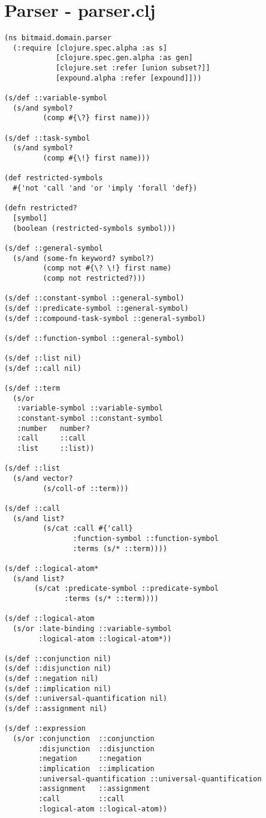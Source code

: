 \section{Parser - parser.clj}
\begin{lstlisting}
(ns bitmaid.domain.parser
  (:require [clojure.spec.alpha :as s]
            [clojure.spec.gen.alpha :as gen]
            [clojure.set :refer [union subset?]]
            [expound.alpha :refer [expound]]))

(s/def ::variable-symbol
  (s/and symbol?
         (comp #{\?} first name)))

(s/def ::task-symbol
  (s/and symbol?
         (comp #{\!} first name)))

(def restricted-symbols
  #{'not 'call 'and 'or 'imply 'forall 'def})

(defn restricted?
  [symbol]
  (boolean (restricted-symbols symbol)))

(s/def ::general-symbol
  (s/and (some-fn keyword? symbol?)
         (comp not #{\? \!} first name)
         (comp not restricted?)))

(s/def ::constant-symbol ::general-symbol)
(s/def ::predicate-symbol ::general-symbol)
(s/def ::compound-task-symbol ::general-symbol)

(s/def ::function-symbol ::general-symbol)

(s/def ::list nil)
(s/def ::call nil)

(s/def ::term
  (s/or
   :variable-symbol ::variable-symbol
   :constant-symbol ::constant-symbol
   :number   number?
   :call     ::call
   :list     ::list))

(s/def ::list
  (s/and vector?
         (s/coll-of ::term)))

(s/def ::call
  (s/and list?
         (s/cat :call #{'call}
                :function-symbol ::function-symbol
                :terms (s/* ::term))))

(s/def ::logical-atom*
  (s/and list?
       (s/cat :predicate-symbol ::predicate-symbol
              :terms (s/* ::term))))

(s/def ::logical-atom
  (s/or :late-binding ::variable-symbol
        :logical-atom ::logical-atom*))

(s/def ::conjunction nil)
(s/def ::disjunction nil)
(s/def ::negation nil)
(s/def ::implication nil)
(s/def ::universal-quantification nil)
(s/def ::assignment nil)

(s/def ::expression
  (s/or :conjunction  ::conjunction
        :disjunction  ::disjunction
        :negation     ::negation
        :implication  ::implication
        :universal-quantification ::universal-quantification
        :assignment   ::assignment
        :call         ::call
        :logical-atom ::logical-atom))


\end{lstlisting}
